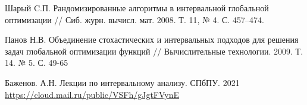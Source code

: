 \newpage
\begin{thebibliography}{9}
Шарый C.П. Рандомизированные алгоритмы в интервальной глобальной оптимизации // Сиб. журн. вычисл. мат. 2008. Т. 11, № 4. С. 457–474.

Панов Н.В. Объединение стохастических и интервальных подходов для решения задач глобальной оптимизации функций // Вычислительные технологии. 2009. Т. 14. № 5. С. 49-65

Баженов. А.Н. Лекции по интервальному анализу. СПбПУ. 2021\\
 \url{https://cloud.mail.ru/public/VSFh/gJgtFVynE}
 
\end{thebibliography}

